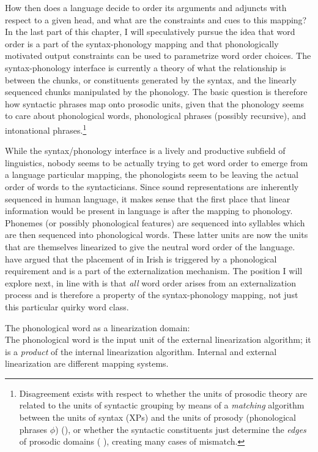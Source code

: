 \documentclass[output=paper,colorlinks,citecolor=brown]{langscibook}
\begin{document}
How then does a language decide to order its arguments and adjuncts with respect to a given head, and what are the constraints and cues to this mapping?  In the last part of this chapter, I will speculatively pursue the idea that word order is a part of the syntax-phonology mapping and that phonologically motivated output constraints can be used to parametrize word order choices. The syntax-phonology interface is currently a theory of what the relationship is between the chunks, or constituents generated by the syntax, and the linearly sequenced chunks manipulated by the phonology. The basic question is therefore how syntactic phrases map onto prosodic units, given that the phonology seems to care about phonological words, phonological phrases (possibly recursive), and intonational phrases.\footnote{Disagreement exists with respect to whether the units of prosodic theory are related to the units of syntactic grouping by means of a \textit{matching}  algorithm between the units of syntax (XPs) and the units of prosody (phonological phrases $\phi$)  (\citealt{selkirk11}), or whether the syntactic constituents just determine the \textit{edges} of prosodic domains (\citealt{selkirk86} \citealt{nesporvogel82}), creating many cases of mismatch.}

While the syntax/phonology interface is a lively and productive subfield of linguistics, nobody seems to be actually trying to get word order to emerge from  a language particular mapping, the phonologists seem to be leaving the actual order of words to the syntacticians. Since sound representations are inherently sequenced in human language, it makes sense that the first place that linear information would be present in language is after the mapping to phonology. Phonemes (or possibly phonological features) are sequenced into syllables which are then sequenced into phonological words.  These latter units are now the units that are themselves linearized to give the neutral word order of the language.  \citet{bennettelfnermccloskey13} have argued that the placement of  in Irish is triggered by a phonological requirement and is a part of the externalization mechanism. The position I will explore next, in line with  is that \textit{all}  word order arises from an externalization process and is therefore a property of the syntax-phonology mapping, not just this particular quirky word class. 

\eanoraggedright\label{ex:lindomain}
The phonological word as a linearization domain:\smallskip\\
The phonological word is the input unit of the external linearization algorithm; it is a \textit{product} of the internal linearization algorithm. Internal and external linearization are different mapping systems.
\z
\end{document}
